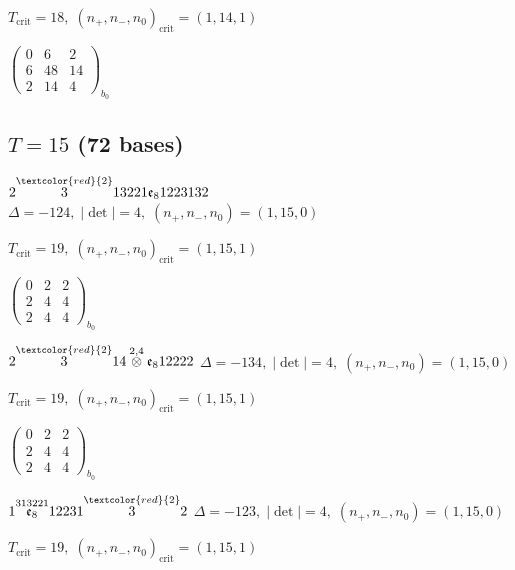 \documentclass[10pt]{article}
\begin{document}
\hspace{1em}$T_{\text{crit}}=18,\; (n_+,n_-,n_0)_{\text{crit}}=(1,14,1)$

\hspace{2em}$\left(\begin{smallmatrix}0 & 6 & 2 \\ 6 & 48 & 14 \\ 2 & 14 & 4\end{smallmatrix}\right)_{\!b_0}$


\subsection*{$T = 15$ \quad (72 bases)}
\smallskip

$2\overset{\textcolor{red}{2}}{3}13221\mathfrak{e}_81223132$ \quad $\Delta=-124,\; |\det|=4,\; (n_+,n_-,n_0)=(1,15,0)$

\hspace{1em}$T_{\text{crit}}=19,\; (n_+,n_-,n_0)_{\text{crit}}=(1,15,1)$

\hspace{2em}$\left(\begin{smallmatrix}0 & 2 & 2 \\ 2 & 4 & 4 \\ 2 & 4 & 4\end{smallmatrix}\right)_{\!b_0}$

\smallskip

$2\overset{\textcolor{red}{2}}{3}14\overset{2,4}{\otimes}\mathfrak{e}_812222$ \quad $\Delta=-134,\; |\det|=4,\; (n_+,n_-,n_0)=(1,15,0)$

\hspace{1em}$T_{\text{crit}}=19,\; (n_+,n_-,n_0)_{\text{crit}}=(1,15,1)$

\hspace{2em}$\left(\begin{smallmatrix}0 & 2 & 2 \\ 2 & 4 & 4 \\ 2 & 4 & 4\end{smallmatrix}\right)_{\!b_0}$

\smallskip

$1\overset{313221}{\mathfrak{e}_8}12231\overset{\textcolor{red}{2}}{3}2$ \quad $\Delta=-123,\; |\det|=4,\; (n_+,n_-,n_0)=(1,15,0)$

\hspace{1em}$T_{\text{crit}}=19,\; (n_+,n_-,n_0)_{\text{crit}}=(1,15,1)$
\end{document}

